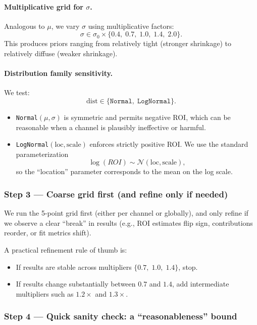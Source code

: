 \documentclass{article}
\begin{document}
\paragraph{Multiplicative grid for $\sigma$.}
Analogous to $\mu$, we vary $\sigma$ using multiplicative factors:
\[
\sigma \in \sigma_0 \times \{0.4,\; 0.7,\; 1.0,\; 1.4,\; 2.0\}.
\]
This produces priors ranging from relatively tight (stronger shrinkage) to relatively diffuse (weaker shrinkage).

\paragraph{Distribution family sensitivity.}
We test:
\[
\text{dist} \in \{\texttt{Normal},\; \texttt{LogNormal}\}.
\]
\begin{itemize}
  \item \texttt{Normal}$(\mu,\sigma)$ is symmetric and permits negative ROI, which can be reasonable when a channel is plausibly ineffective or harmful.
  \item \texttt{LogNormal}$(\text{loc},\text{scale})$ enforces strictly positive ROI. We use the standard parameterization
  \[
  \log(ROI)\sim \mathcal{N}(\text{loc},\text{scale}),
  \]
  so the ``location'' parameter corresponds to the mean on the log scale.
\end{itemize}

\subsubsection*{Step 3 --- Coarse grid first (and refine only if needed)}

We run the 5-point grid first (either per channel or globally), and only refine if we observe a clear ``break'' in results (e.g., ROI estimates flip sign, contributions reorder, or fit metrics shift).

A practical refinement rule of thumb is:
\begin{itemize}
  \item If results are stable across multipliers $\{0.7,\;1.0,\;1.4\}$, stop.
  \item If results change substantially between $0.7$ and $1.4$, add intermediate multipliers such as $1.2\times$ and $1.3\times$.
\end{itemize}

\subsubsection*{Step 4 --- Quick sanity check: a ``reasonableness'' bound}
\end{document}
